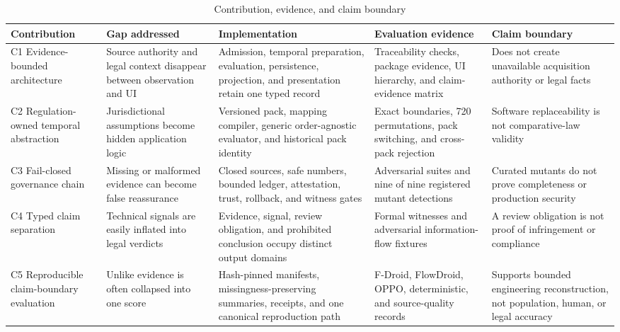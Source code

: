 \begin{table}[H]
\centering
\caption{Contribution, evidence, and claim boundary}
\label{tab:contribution-map}
\scriptsize
\setlength{\tabcolsep}{3pt}
\begin{tabular}{>{\raggedright\arraybackslash}p{}>{\raggedright\arraybackslash}p{}>{\raggedright\arraybackslash}p{}>{\raggedright\arraybackslash}p{}>{\raggedright\arraybackslash}p{}}
\toprule
Contribution & Gap addressed & Implementation & Evaluation evidence & Claim boundary \\
\midrule
C1 Evidence-bounded architecture & Source authority and legal context disappear between observation and UI & Admission, temporal preparation, evaluation, persistence, projection, and presentation retain one typed record & Traceability checks, package evidence, UI hierarchy, and claim-evidence matrix & Does not create unavailable acquisition authority or legal facts \\
C2 Regulation-owned temporal abstraction & Jurisdictional assumptions become hidden application logic & Versioned pack, mapping compiler, generic order-agnostic evaluator, and historical pack identity & Exact boundaries, 720 permutations, pack switching, and cross-pack rejection & Software replaceability is not comparative-law validity \\
C3 Fail-closed governance chain & Missing or malformed evidence can become false reassurance & Closed sources, safe numbers, bounded ledger, attestation, trust, rollback, and witness gates & Adversarial suites and nine of nine registered mutant detections & Curated mutants do not prove completeness or production security \\
C4 Typed claim separation & Technical signals are easily inflated into legal verdicts & Evidence, signal, review obligation, and prohibited conclusion occupy distinct output domains & Formal witnesses and adversarial information-flow fixtures & A review obligation is not proof of infringement or compliance \\
C5 Reproducible claim-boundary evaluation & Unlike evidence is often collapsed into one score & Hash-pinned manifests, missingness-preserving summaries, receipts, and one canonical reproduction path & F-Droid, FlowDroid, OPPO, deterministic, and source-quality records & Supports bounded engineering reconstruction, not population, human, or legal accuracy \\
\bottomrule
\end{tabular}
\end{table}


